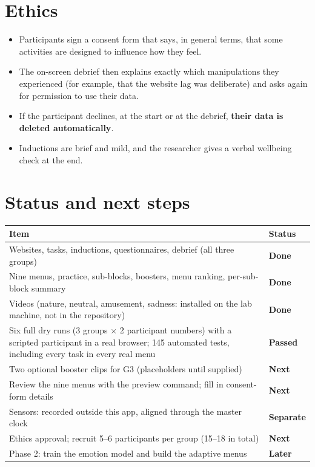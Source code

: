 \documentclass[11pt,a4paper]{article}
\renewcommand{\arraystretch}{1.25}
\begin{document}
\section{Ethics}

\begin{itemize}
  \item Participants sign a consent form that says, in general terms, that some activities are designed to influence how they feel.
  \item The on-screen debrief then explains exactly which manipulations they experienced (for example, that the website lag was deliberate) and asks again for permission to use their data.
  \item If the participant declines, at the start or at the debrief, \textbf{their data is deleted automatically}.
  \item Inductions are brief and mild, and the researcher gives a verbal wellbeing check at the end.
\end{itemize}

\section{Status and next steps}

\begin{table}[H]
\centering\small\renewcommand{\arraystretch}{1.1}
\begin{tabularx}{\linewidth}{@{}L l@{}}
\toprule
\textbf{Item} & \textbf{Status}\\
\midrule
Websites, tasks, inductions, questionnaires, debrief (all three groups) & \textcolor{g1}{\textbf{Done}}\\
Nine menus, practice, sub-blocks, boosters, menu ranking, per-sub-block summary & \textcolor{g1}{\textbf{Done}}\\
Videos (nature, neutral, amusement, sadness: installed on the lab machine, not in the repository) & \textcolor{g1}{\textbf{Done}}\\
Six full dry runs (3 groups $\times$ 2 participant numbers) with a scripted participant in a real browser; 145 automated tests, including every task in every real menu & \textcolor{g1}{\textbf{Passed}}\\
Two optional booster clips for G3 (placeholders until supplied) & \textcolor{g2}{\textbf{Next}}\\
Review the nine menus with the preview command; fill in consent-form details & \textcolor{g2}{\textbf{Next}}\\
Sensors: recorded outside this app, aligned through the master clock & \textcolor{g2}{\textbf{Separate}}\\
Ethics approval; recruit 5--6 participants per group (15--18 in total) & \textcolor{g2}{\textbf{Next}}\\
Phase 2: train the emotion model and build the adaptive menus & \textcolor{muted}{\textbf{Later}}\\
\bottomrule
\end{tabularx}
\end{table}
\end{document}
